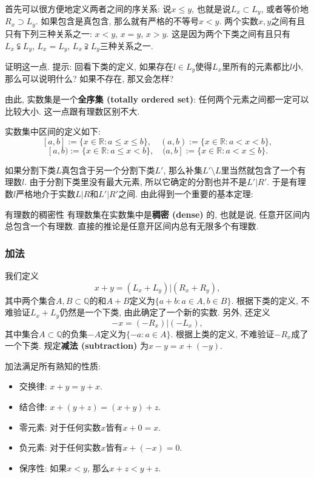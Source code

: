 首先可以很方便地定义两者之间的序关系: 说$x\leq y$, 也就是说$L_x\subset L_y$, 或者等价地$R_x\supset L_y$. 如果包含是真包含, 那么就有严格的不等号$x<y$. 两个实数$x,y$之间有且只有下列三种关系之一: $x<y$, $x=y$, $x>y$. 这是因为两个下类之间有且只有$L_x\subsetneqq L_y$, $L_x=L_y$, $L_x\supsetneqq L_y$三种关系之一.

\begin{exercise}{}
证明这一点. 提示: 回看下类的定义, 如果存在$l\in L_y$使得$L_x$里所有的元素都比$l$小, 那么可以说明什么? 如果不存在, 那又会怎样?
\end{exercise}

由此, 实数集是一个\textbf{全序集 (totally ordered set)}: 任何两个元素之间都一定可以比较大小. 这一点跟有理数区别不大.

实数集中区间的定义如下: 
$$
[a,b]:=\{x\in\mathbb{R}:a\leq x\leq b\},
\quad
(a,b):=\{x\in\mathbb{R}:a< x< b\},
$$
$$
[a,b):=\{x\in\mathbb{R}:a\leq x< b\},
\quad
(a,b]:=\{x\in\mathbb{R}:a< x\leq b\}.
$$

如果分割下类$L$真包含于另一个分割下类$L'$, 那么补集$L'\setminus L$里当然就包含了一个有理数$l$. 由于分割下类里没有最大元素, 所以它确定的分割也并不是$L'|R'$. 于是有理数$l$严格地介于实数$L|R$和$L'|R'$之间. 由此得到一个重要的基本定理:
\begin{theorem}{有理数的稠密性}
有理数集在实数集中是\textbf{稠密 (dense)} 的, 也就是说, 任意开区间内总包含一个有理数. 直接的推论是任意开区间内总有无限多个有理数.
\end{theorem}

\subsubsection{加法}

我们定义
$$
x+y=(L_x+L_y)|(R_x+R_y),
$$
其中两个集合$A,B\subset\mathbb{Q}$的和$A+B$定义为$\{a+b:a\in A, b\in B\}$. 根据下类的定义, 不难验证$L_x+L_y$仍然是一个下类, 由此确定了一个新的实数. 另外, 还定义
$$
-x=(-R_x)|(-L_x),
$$
其中集合$A\subset\mathbb{Q}$的负集$-A$定义为$\{-a:a\in A\}$. 根据上类的定义, 不难验证$-R_x$成了一个下类. 规定\textbf{减法 (subtraction)} 为$x-y=x+(-y)$.

加法满足所有熟知的性质:

\begin{itemize}
\item 交换律: $x+y=y+x$.
\item 结合律: $x+(y+z)=(x+y)+z$.
\item 零元素: 对于任何实数$x$皆有$x+0=x$.
\item 负元素: 对于任何实数$x$皆有$x+(-x)=0$.
\item 保序性: 如果$x<y$, 那么$x+z<y+z$.
\end{itemize}

